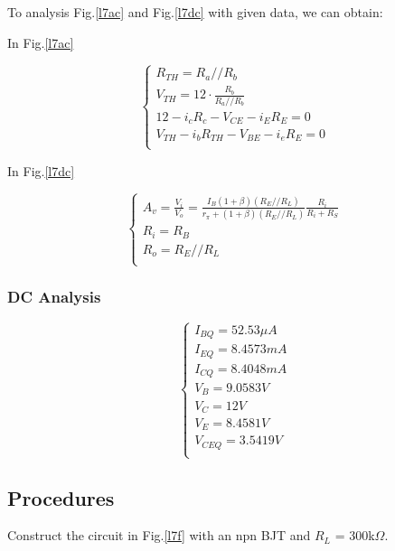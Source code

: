     \FloatBarrier
    To analysis Fig.\ref{l7ac} and Fig.\ref{l7dc} with given data, we can obtain:\par
    In Fig.\ref{l7ac}\par
    \begin{equation}
        \begin{cases}
            R_{TH} = R_a//R_b\\
            V_{TH} = 12\cdot\frac{R_b}{R_a//R_b}\\
            12-i_cR_c-V_{CE}-i_ER_E=0\\
            V_{TH}-i_bR_{TH}-V_{BE}-i_eR_E=0\\
        \end{cases}
    \end{equation}
    
    In Fig.\ref{l7dc}\par
    \begin{equation}
        \begin{cases}
            A_v = \frac{V_i}{V_o} = \frac{I_B(1+\beta)(R_E//R_L)}{r_\pi+(1+\beta)(R_E//R_L)}\frac{R_i}{R_i+R_S}\\
            R_i = R_B\\
            R_o = R_E//R_L\\
        \end{cases}
    \label{l7eq1}
    \end{equation}

    \subsubsection{DC Analysis}
    \begin{equation*}
        \begin{cases}
            I_{BQ}=52.53\mu A\\
            I_{EQ}=8.4573mA\\
            I_{CQ}=8.4048mA\\
            V_B=9.0583V\\
            V_C=12V\\
            V_E=8.4581V\\
            V_{CEQ}=3.5419V\\
        \end{cases}
    \end{equation*}
    \FloatBarrier
    
    \subsection{Procedures}
    Construct the circuit in Fig.\ref{l7f} with an npn BJT and $R_L$ = 300k$\Omega$.
